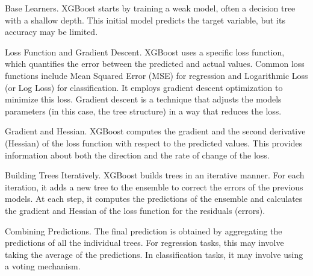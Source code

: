 Base Learners. XGBoost starts by training a weak model, often a decision
tree with a shallow depth. This initial model predicts the target
variable, but its accuracy may be limited.

Loss Function and Gradient Descent. XGBoost uses a specific loss
function, which quantifies the error between the predicted and actual
values. Common loss functions include Mean Squared Error (MSE) for
regression and Logarithmic Loss (or Log Loss) for classification. It
employs gradient descent optimization to minimize this loss. Gradient
descent is a technique that adjusts the model\textquotesingle s
parameters (in this case, the tree structure) in a way that reduces the
loss.

Gradient and Hessian. XGBoost computes the gradient and the second
derivative (Hessian) of the loss function with respect to the predicted
values. This provides information about both the direction and the rate
of change of the loss.

Building Trees Iteratively. XGBoost builds trees in an iterative manner.
For each iteration, it adds a new tree to the ensemble to correct the
errors of the previous models. At each step, it computes the predictions
of the ensemble and calculates the gradient and Hessian of the loss
function for the residuals (errors).

Combining Predictions. The final prediction is obtained by aggregating
the predictions of all the individual trees. For regression tasks, this
may involve taking the average of the predictions. In classification
tasks, it may involve using a voting mechanism.
